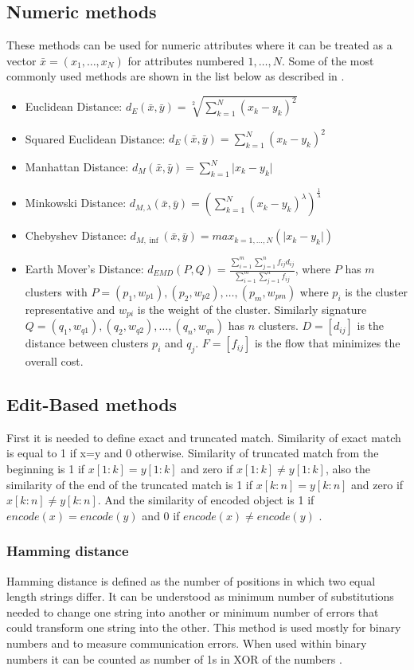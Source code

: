 \subsection{Numeric methods}
These methods can be used for numeric attributes where it can be treated as a vector $\bar{x}=(x_1,\ldots,x_N)$ for attributes numbered $1,\ldots,N$. Some of the most commonly used methods are shown in the list below as described in \cite{simvzorecky}.
\begin{itemize}
\item Euclidean Distance: $d_E (\bar{x},\bar{y})=\sqrt[2]{\sum_{k=1}^N (x_k-y_k)^2} $
\item Squared Euclidean Distance: $d_E (\bar{x},\bar{y})=\sum_{k=1}^N (x_k-y_k)^2 $
\item Manhattan Distance: $d_M (\bar{x},\bar{y})=\sum_{k=1}^N 
{\lvert x_k-y_k \rvert}$
\item Minkowski Distance: $d_{M,\lambda} (\bar{x},\bar{y})=(\sum_{k=1}^N (x_k-y_k)^\lambda)^{\frac{1}{\lambda}} $
\item Chebyshev Distance: $d_{M,\inf} (\bar{x},\bar{y})=max_{k=1,\ldots,N}(\lvert x_k-y_k \rvert) $
\item Earth Mover's Distance: $d_{EMD}(P,Q)=\frac{\sum_{i=1}^m\sum_{j=1}^n f_{ij}d_{ij}}{\sum_{i=1}^m\sum_{j=1}^n f_{ij}}$, where $P$ has $m$ clusters with $P={(p_1, w_{p1}), (p_2, w_{p2}),\ldots,(p_m, w_{pm})}$ where $p_i$ is the cluster representative and $w_{pi}$ is the weight of the cluster. Similarly signature $Q={(q_1, w_{q1}), (q_2, w_{q2}),\ldots,(q_n, w_{qn})}$ has $n$ clusters. $D=[d_{ij}]$ is the distance between clusters $p_i$ and $q_j$. $F=[f_{ij}]$ is the flow that minimizes the overall cost.
\end{itemize}

\subsection{Edit-Based methods}
First it is needed to define exact and truncated match. Similarity of exact match is equal to 1 if x=y and 0 otherwise. Similarity of truncated match from the beginning is 1 if $x[1:k] = y[1:k]$ and zero if $x[1:k] \neq y[1:k]$, also the similarity of the end of the truncated match is 1 if $x[k:n] = y[k:n]$ and zero if $x[k:n] \neq y[k:n]$. And the similarity of encoded object is 1 if $encode(x)=encode(y)$ and 0 if $encode(x) \neq encode (y)$ \cite{sim2Dstrings}.

\subsubsection{Hamming distance}
Hamming distance is defined as the number of positions in which two equal length strings differ. It can be understood as minimum number of substitutions needed to change one string into another or minimum number of errors that could transform one string into the other.
This method is used mostly for binary numbers and to measure communication errors. When used within binary numbers it can be counted as number of 1s in XOR of the numbers \cite{hamming}.

